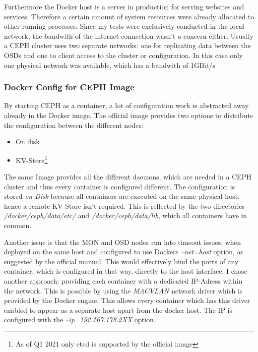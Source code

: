 \documentclass[titlepage, a4paper, 11pt]{scrartcl}
\begin{document}
                Furthermore the Docker host is a server in production for serving websites and services. 
                Therefore a certain amount of system resources were already allocated to other running processes.
                Since my tests were exclusively conducted in the local network, the bandwith of the internet connection wasn't a concern either.
                Usually a CEPH cluster uses two separate networks: one for replicating data between the OSDs and one to client access to the cluster or configuration.
                In this case only one physical network was available, which has a bandwith of 1GBit/s

            \subsubsection{Docker Config for CEPH Image}\label{config:docker}

                By starting CEPH as a container, a lot of configuration work is abstracted away already in the Docker image.
                The official image \cite{DockerHub} provides two options to distribute the configuration between the different nodes:

                \begin{itemize}
                    \item On disk
                    \item KV-Store\footnote{As of Q1 2021 only etcd is supported by the official image}
                \end{itemize}

                The same Image provides all the different daemons, which are needed in a CEPH cluster and thus every container is configured different.
                The configuration is stored \textit{on Disk} because all containers are executed on the same physical host, hence a remote KV-Store isn't required.
                This is reflected by the two directories \textit{/docker/ceph/data/etc/} and \textit{/docker/ceph/data/lib}, which all containers have in common.
                
                Another issue is that the MON and OSD nodes run into timeout issues, when deployed on the same host and configured to use Dockers \textit{--net=host} option, as suggested by the official manual. This would effectively bind the ports of any container, which is configured in that way, directly to the host interface. 
                I chose another approach: providing each container with a dedicated IP-Adress within the network. This is possible by using the \textit{MACVLAN} network
                driver which is provided by the Docker engine. This allows every container which has this driver enabled to appear as a separate host apart from the docker host. The IP is configured with the \textit{--ip=192.167.178.2XX} option.
\end{document}
